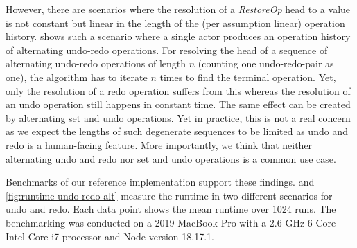 \documentclass[sigplan,natbib=false,review]{acmart}
\newcommand{\restopkind}{\textit{RestoreOp}}
\begin{document}
However, there are scenarios where the resolution of a \restopkind{} head
to a value is not constant but linear in the length
of the (per assumption linear) operation history.
 shows such a scenario where a single actor
produces an operation history of alternating undo-redo operations.
For resolving the head of a sequence of alternating undo-redo operations
of length $n$ (counting one undo-redo-pair as one),
the algorithm has to iterate $n$ times to find the terminal operation.
Yet, only the resolution of a redo operation suffers from this whereas
the resolution of an undo operation still happens in constant time.
The same effect can be created by alternating set and undo operations.
Yet in practice, this is not a real concern as we expect the lengths of such
degenerate sequences to be limited as undo and redo is a human-facing feature.
More importantly, we think that neither alternating undo and redo
nor set and undo operations is a common use case.

Benchmarks of our reference implementation support these findings.
 and \cref{fig:runtime-undo-redo-alt} measure
the runtime in two different scenarios for undo and redo.
Each data point shows the mean runtime over 1024 runs.
The benchmarking was conducted on a 2019 MacBook Pro with a 
2.6 GHz 6-Core Intel Core i7 processor and Node version 18.17.1.
\end{document}
